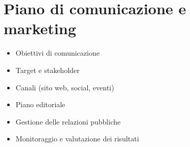 
\section*{Piano di comunicazione e marketing}

\begin{itemize}
  \item Obiettivi di comunicazione
  \item Target e stakeholder
  \item Canali (sito web, social, eventi)
  \item Piano editoriale
  \item Gestione delle relazioni pubbliche
  \item Monitoraggio e valutazione dei risultati
\end{itemize}

